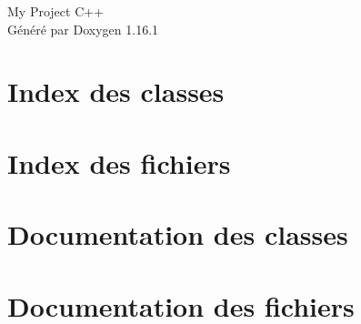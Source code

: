 \documentclass[twoside]{book}
\newcommand{\+}{\discretionary{\mbox{\scriptsize$\hookleftarrow$}}{}{}}
\newcommand{\clearemptydoublepage}{%
    \newpage{\pagestyle{empty}\cleardoublepage}%
  }
\begin{document}
  \raggedbottom
    \hypersetup{pageanchor=false,
                bookmarksnumbered=true,
                pdfencoding=unicode
               }
  \begin{titlepage}
  \vspace*{7cm}
  \begin{center}%
  {\Large My Project C++}\\
  \vspace*{1cm}
  {\large Généré par Doxygen 1.16.1}\\
  \end{center}
  \end{titlepage}
  \clearemptydoublepage
  \tableofcontents
  \clearemptydoublepage
  \hypersetup{pageanchor=true}
\chapter{Index des classes}

\chapter{Index des fichiers}

\chapter{Documentation des classes}








\chapter{Documentation des fichiers}





























  \backmatter
  \newpage
  \clearemptydoublepage
  \printindex
\end{document}
